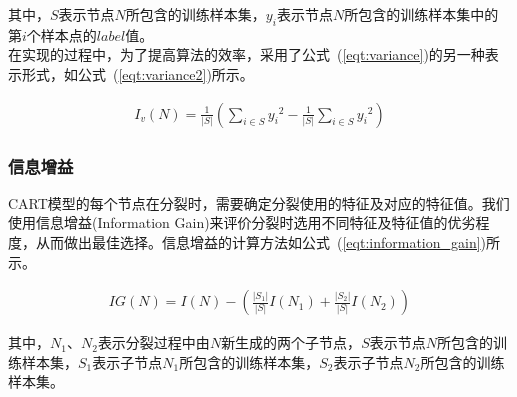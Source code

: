 \documentclass[a4paper,11pt,         %
               ]{article}
\begin{document}
其中，$S$表示节点$N$所包含的训练样本集，$y_{i}$表示节点$N$所包含的训练样本集中的第$i$个样本点的$label$值。 \\

在实现的过程中，为了提高算法的效率，采用了公式~(\ref{eqt:variance})的另一种表示形式，如公式~(\ref{eqt:variance2})所示。

\begin{eqnarray}
  \label{eqt:variance2}
{I}_{v}(N)=\frac{1}{\left | S \right |}\left ( \sum_{i\in S} {y_{i}}^2 - \frac{1}{\left | S \right |} \sum_{i \in S} {y_{i}}^2 \right )
\end{eqnarray}


\subsubsection{信息增益}


CART模型的每个节点在分裂时，需要确定分裂使用的特征及对应的特征值。我们使用信息增益(Information Gain)来评价分裂时选用不同特征及特征值的优劣程度，从而做出最佳选择。信息增益的计算方法如公式~(\ref{eqt:information_gain})所示。

\begin{eqnarray}
  \label{eqt:information_gain}
IG(N) = I(N) - \left ( \frac{\left | S_{1}\right |}{\left | S \right |} I\left ( N_{1} \right ) + \frac{\left | S_{2}\right |}{\left | S \right |} I\left ( N_{2} \right )\right)
\end{eqnarray}

其中，$N_{1}$、$N_{2}$表示分裂过程中由$N$新生成的两个子节点，$S$表示节点$N$所包含的训练样本集，$S_{1}$表示子节点$N_{1}$所包含的训练样本集，$S_{2}$表示子节点$N_{2}$所包含的训练样本集。




\end{document}
